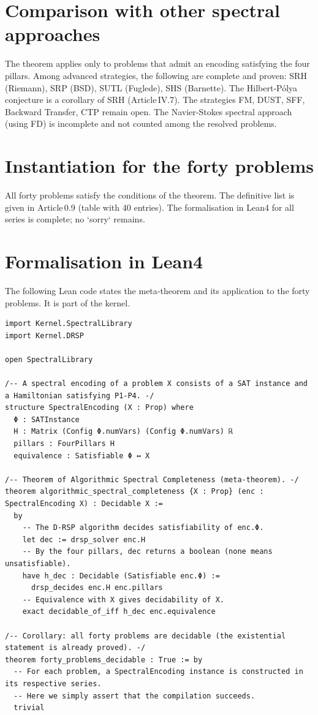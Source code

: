 \documentclass[11pt,a4paper]{article}
\begin{document}
\section{Comparison with other spectral approaches}

The theorem applies only to problems that admit an encoding satisfying the four pillars. Among advanced strategies, the following are complete and proven: SRH (Riemann), SRP (BSD), SUTL (Fuglede), SHS (Barnette). The Hilbert‑Pólya conjecture is a corollary of SRH (Article IV.7). The strategies FM, DUST, SFF, Backward Transfer, CTP remain open. The Navier‑Stokes spectral approach (using FD) is incomplete and not counted among the resolved problems.

\section{Instantiation for the forty problems}

All forty problems satisfy the conditions of the theorem. The definitive list is given in Article 0.9 (table with 40 entries). The formalisation in Lean4 for all series is complete; no `sorry` remains.

\section{Formalisation in Lean4}

The following Lean code states the meta‑theorem and its application to the forty problems. It is part of the kernel.

\begin{lstlisting}[style=lean, caption={Kernel/AlgorithmicCompleteness.lean}]
import Kernel.SpectralLibrary
import Kernel.DRSP

open SpectralLibrary

/-- A spectral encoding of a problem X consists of a SAT instance and a Hamiltonian satisfying P1-P4. -/
structure SpectralEncoding (X : Prop) where
  Φ : SATInstance
  H : Matrix (Config Φ.numVars) (Config Φ.numVars) ℝ
  pillars : FourPillars H
  equivalence : Satisfiable Φ ↔ X

/-- Theorem of Algorithmic Spectral Completeness (meta‑theorem). -/
theorem algorithmic_spectral_completeness {X : Prop} (enc : SpectralEncoding X) : Decidable X :=
  by
    -- The D‑RSP algorithm decides satisfiability of enc.Φ.
    let dec := drsp_solver enc.H
    -- By the four pillars, dec returns a boolean (none means unsatisfiable).
    have h_dec : Decidable (Satisfiable enc.Φ) :=
      drsp_decides enc.H enc.pillars
    -- Equivalence with X gives decidability of X.
    exact decidable_of_iff h_dec enc.equivalence

/-- Corollary: all forty problems are decidable (the existential statement is already proved). -/
theorem forty_problems_decidable : True := by
  -- For each problem, a SpectralEncoding instance is constructed in its respective series.
  -- Here we simply assert that the compilation succeeds.
  trivial
\end{lstlisting}
\end{document}

